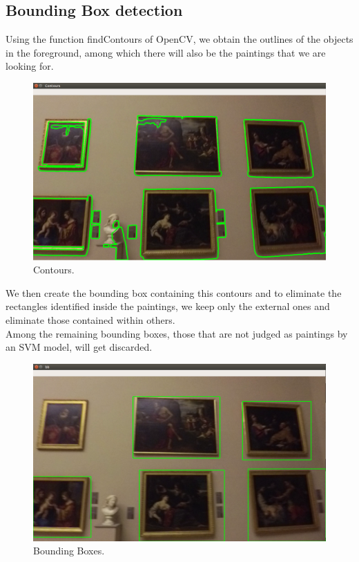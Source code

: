 \documentclass[conference]{IEEEtran}
\begin{document}
\bigskip

\subsection{Bounding Box detection}
Using the function findContours of OpenCV, we obtain the outlines of the objects in the foreground, among which there will also be the paintings that we are looking for.\\
\bigskip

\begin{figure}[htbp]
  \centering
  \includegraphics[width=0.8\columnwidth]{../detection_pipeline/3_contours.png}
  \caption{Contours.}
  \label{fig:ROC_curve}
\end{figure}

\bigskip
We then create the bounding box containing this contours and to eliminate the rectangles identified inside the paintings, we keep only the external ones and eliminate those contained within others.\\
Among the remaining bounding boxes, those that are not judged as paintings by an SVM model, will get discarded.

\bigskip

\begin{figure}[htbp]
  \centering
  \includegraphics[width=0.8\columnwidth]{../detection_pipeline/4_bb.png}
  \caption{Bounding Boxes.}
  \label{fig:ROC_curve}
\end{figure}
\end{document}
